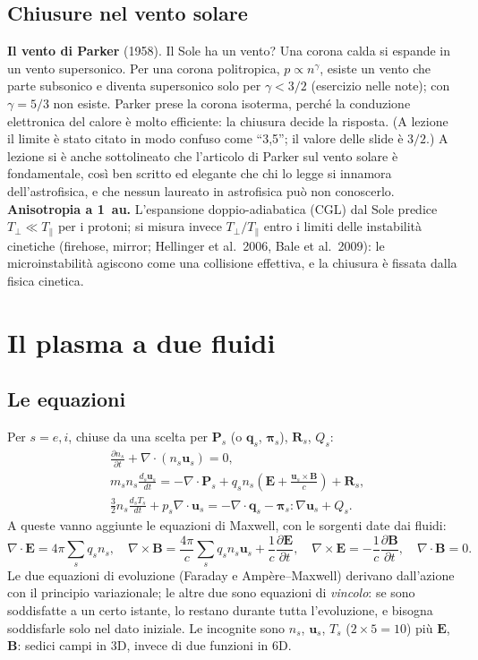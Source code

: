 \subsection{Chiusure nel vento solare}
\textbf{Il vento di Parker} (1958). Il Sole ha un vento? Una corona calda si espande in un vento supersonico. Per una corona politropica, $p\propto n^\gamma$, esiste un vento che parte subsonico e diventa supersonico solo per $\gamma<3/2$ (esercizio nelle note); con $\gamma=5/3$ non esiste. Parker prese la corona isoterma, perché la conduzione elettronica del calore è molto efficiente: la chiusura decide la risposta. (A lezione il limite è stato citato in modo confuso come ``3,5''; il valore delle slide è $3/2$.) A lezione si è anche sottolineato che l'articolo di Parker sul vento solare è fondamentale, così ben scritto ed elegante che chi lo legge si innamora dell'astrofisica, e che nessun laureato in astrofisica può non conoscerlo.
\textbf{Anisotropia a 1~au.} L'espansione doppio-adiabatica (CGL) dal Sole predice $T_\perp\ll T_\parallel$ per i protoni; si misura invece $T_\perp/T_\parallel$ entro i limiti delle instabilità cinetiche (firehose, mirror; Hellinger et al.~2006, Bale et al.~2009): le microinstabilità agiscono come una collisione effettiva, e la chiusura è fissata dalla fisica cinetica.

\section{Il plasma a due fluidi}

\subsection{Le equazioni}
Per $s=e,i$, chiuse da una scelta per $\mathbf{P}_s$ (o $\mathbf{q}_s$, $\boldsymbol\pi_s$), $\mathbf{R}_s$, $Q_s$:
\begin{align}
&\frac{\partial n_s}{\partial t}+\nabla\cdot(n_s\mathbf{u}_s)=0,\\
&m_sn_s\frac{d_s\mathbf{u}_s}{dt}=-\nabla\cdot\mathbf{P}_s+q_sn_s\left(\mathbf{E}+\frac{\mathbf{u}_s\times\mathbf{B}}{c}\right)+\mathbf{R}_s,\\
&\frac32n_s\frac{d_sT_s}{dt}+p_s\nabla\cdot\mathbf{u}_s=-\nabla\cdot\mathbf{q}_s-\boldsymbol\pi_s:\nabla\mathbf{u}_s+Q_s .
\end{align}
A queste vanno aggiunte le equazioni di Maxwell, con le sorgenti date dai fluidi:
\begin{equation}
\nabla\cdot\mathbf{E}=4\pi\sum_sq_sn_s,\quad\nabla\times\mathbf{B}=\frac{4\pi}{c}\sum_sq_sn_s\mathbf{u}_s+\frac1c\frac{\partial\mathbf{E}}{\partial t},\quad\nabla\times\mathbf{E}=-\frac1c\frac{\partial\mathbf{B}}{\partial t},\quad\nabla\cdot\mathbf{B}=0 .
\end{equation}
Le due equazioni di evoluzione (Faraday e Amp\`ere--Maxwell) derivano dall'azione con il principio variazionale; le altre due sono equazioni di \emph{vincolo}: se sono soddisfatte a un certo istante, lo restano durante tutta l'evoluzione, e bisogna soddisfarle solo nel dato iniziale. Le incognite sono $n_s$, $\mathbf{u}_s$, $T_s$ ($2\times5=10$) più $\mathbf{E}$, $\mathbf{B}$: sedici campi in 3D, invece di due funzioni in 6D.

